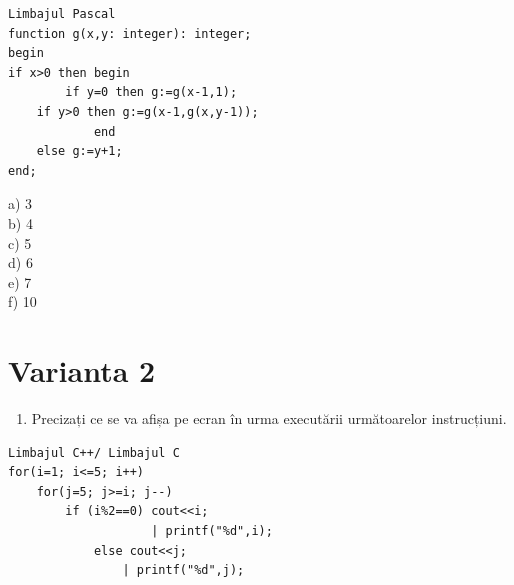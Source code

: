 \documentclass[10pt]{article}
\begin{document}
\begin{verbatim}
Limbajul Pascal
function g(x,y: integer): integer;
begin
if x>0 then begin
        if y=0 then g:=g(x-1,1);
    if y>0 then g:=g(x-1,g(x,y-1));
            end
    else g:=y+1;
end;
\end{verbatim}

a) 3\\
b) 4\\
c) 5\\
d) 6\\
e) 7\\
f) 10

\section*{Varianta 2}
\begin{enumerate}
  \item Precizați ce se va afișa pe ecran în urma executării următoarelor instrucțiuni.
\end{enumerate}

\begin{verbatim}
Limbajul C++/ Limbajul C
for(i=1; i<=5; i++)
    for(j=5; j>=i; j--)
        if (i%2==0) cout<<i;
                    | printf("%d",i);
            else cout<<j;
                | printf("%d",j);
\end{verbatim}
\end{document}
